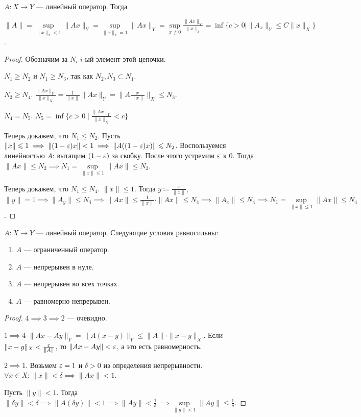 \begin{theorem}
    $A\!: X \to Y$ --- линейный оператор. Тогда

     $\|A\| = \sup\limits_{\| x\|_x < 1} \|Ax\|_Y = \sup\limits_{\| x\|_x = 1} \|Ax\|_Y = \sup\limits_{x \neq 0} \frac{\|Ax\|_Y}{\|x\|_x} = \inf\{ c > 0 \mid \|A_x\|_Y \le C \|x\|_X\}$.
\end{theorem}
\begin{proof}
    Обозначим за $N_i$  $i$-ый элемент этой цепочки. 

     $N_1 \ge N_2$ и $N_1 \ge N_3$,  так как $N_2, N_3 \subset N_1$. 

     $N_3 \ge N_4$. $\frac{\|Ax\|_Y}{\|x\|_X} = \frac{1}{\|x\|}\|Ax\|_Y = \|A \frac{x}{\|x\|}\|_X \le N_3$.

     $N_4 = N_5$. $N_5 = \inf \{ c>0 \mid \frac{\|Ax\|_Y}{\|x\|_X} < c\}$

     Теперь докажем, что $N_1 \le N_2$. Пусть $\| x \| \leqslant 1 \implies \| (1-\varepsilon) x \| < 1 \implies \| A((1-\varepsilon)x) \| \leqslant N_2$. Воспользуемся линейностью $A$: вытащим  $(1-\varepsilon)$ за скобку. После этого устремим  $\varepsilon$ к 0. Тогда  $\| Ax \| \le N_2 \implies N_1 = \sup\limits_{\| x \| \le 1} \| A x\| \le N_2$.

     Теперь докажем, что $N_1 \le N_4$. $\| x \| \le 1$. Тогда $y \coloneqq \frac{x}{\| x \|}$, $\|y\| = 1 \implies \| A_y \| \le N_4 \implies \| Ax \| \le \frac{1}{\|x\|} \cdot \| Ax \| \le N_4 \implies \| A_x \| \le N_4 \implies N_1 = \sup\limits_{\|x \| \le 1} \|Ax\| \le N_4$.
\end{proof}
\begin{theorem}
   $A\!: X \to Y$ --- линейный оператор. Следующие условия равносильны:
   \begin{enumerate}
       \item $A$ --- ограниченный оператор.
       \item  $A$ --- непрерывен в нуле.
       \item  $A$ --- непрерывен во всех точках.
       \item $A$ --- равномерно непрерывен.
   \end{enumerate}
\end{theorem}
\begin{proof}
    $4 \implies 3 \implies 2$ --- очевидно.

    $1 \implies 4$  $\|Ax - Ay\|_Y = \|A(x-y)\|_Y \le \|A\| \cdot \|x-y\|_X$. Если $\|x-y\|_X < \frac{\varepsilon}{\|A\|}$, то $\|Ax - Ay\| < \varepsilon$, а это есть равномерность.

    $2 \implies 1$. Возьмем  $\varepsilon = 1$ и  $\delta > 0$ из определения непрерывности.  $\forall x \in X\!: \|x \| < \delta \implies \|Ax\| < 1$.

    Пусть $\|y\| < 1$. Тогда  $\|\delta y\| < \delta \implies \|A(\delta y)\| < 1 \implies \|Ay\| < \frac{1}{\delta} \implies \sup\limits_{\| y \| < 1} \| Ay\| \le \frac{1}{\delta}$.
\end{proof}
